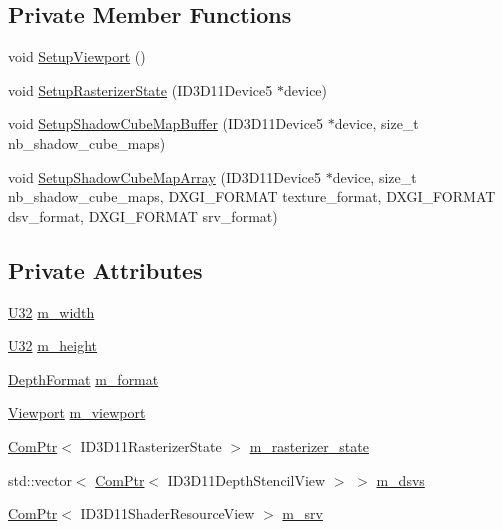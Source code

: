 \subsection*{Private Member Functions}
\begin{DoxyCompactItemize}
\item 
void \hyperlink{structmage_1_1_shadow_cube_map_buffer_a612f25e151e575a7266b41ddb6a072cf}{Setup\+Viewport} ()
\item 
void \hyperlink{structmage_1_1_shadow_cube_map_buffer_a2bee1ede60f16cc3b9cfc9ee72a8dec9}{Setup\+Rasterizer\+State} (I\+D3\+D11\+Device5 $\ast$device)
\item 
void \hyperlink{structmage_1_1_shadow_cube_map_buffer_a0ac976b6d2a8730bce826fa7ffa502db}{Setup\+Shadow\+Cube\+Map\+Buffer} (I\+D3\+D11\+Device5 $\ast$device, size\+\_\+t nb\+\_\+shadow\+\_\+cube\+\_\+maps)
\item 
void \hyperlink{structmage_1_1_shadow_cube_map_buffer_af2fcb67943e27ee60c71524993493109}{Setup\+Shadow\+Cube\+Map\+Array} (I\+D3\+D11\+Device5 $\ast$device, size\+\_\+t nb\+\_\+shadow\+\_\+cube\+\_\+maps, D\+X\+G\+I\+\_\+\+F\+O\+R\+M\+AT texture\+\_\+format, D\+X\+G\+I\+\_\+\+F\+O\+R\+M\+AT dsv\+\_\+format, D\+X\+G\+I\+\_\+\+F\+O\+R\+M\+AT srv\+\_\+format)
\end{DoxyCompactItemize}
\subsection*{Private Attributes}
\begin{DoxyCompactItemize}
\item 
\hyperlink{namespacemage_a41c104c036fba3756a74e19f793eeaa1}{U32} \hyperlink{structmage_1_1_shadow_cube_map_buffer_a9492f3ff2146a03d30f3f02fd7985aba}{m\+\_\+width}
\item 
\hyperlink{namespacemage_a41c104c036fba3756a74e19f793eeaa1}{U32} \hyperlink{structmage_1_1_shadow_cube_map_buffer_ac20a53ecc1ec9a00a2241f8c8a3405e6}{m\+\_\+height}
\item 
\hyperlink{namespacemage_aed4c3f883a30484d0a20762c06be81d4}{Depth\+Format} \hyperlink{structmage_1_1_shadow_cube_map_buffer_ada9a7c895a74303904f9884b986c935f}{m\+\_\+format}
\item 
\hyperlink{classmage_1_1_viewport}{Viewport} \hyperlink{structmage_1_1_shadow_cube_map_buffer_aac92648e1af47ffdf99575cdaab0485e}{m\+\_\+viewport}
\item 
\hyperlink{namespacemage_ae74f374780900893caa5555d1031fd79}{Com\+Ptr}$<$ I\+D3\+D11\+Rasterizer\+State $>$ \hyperlink{structmage_1_1_shadow_cube_map_buffer_a72ffa7fc89386a954b33fac38a894f2c}{m\+\_\+rasterizer\+\_\+state}
\item 
std\+::vector$<$ \hyperlink{namespacemage_ae74f374780900893caa5555d1031fd79}{Com\+Ptr}$<$ I\+D3\+D11\+Depth\+Stencil\+View $>$ $>$ \hyperlink{structmage_1_1_shadow_cube_map_buffer_ad8a493d831b8ecd08d18fa1a3312143b}{m\+\_\+dsvs}
\item 
\hyperlink{namespacemage_ae74f374780900893caa5555d1031fd79}{Com\+Ptr}$<$ I\+D3\+D11\+Shader\+Resource\+View $>$ \hyperlink{structmage_1_1_shadow_cube_map_buffer_a16738a534aca6de39aec687bc79ede1c}{m\+\_\+srv}
\end{DoxyCompactItemize}


